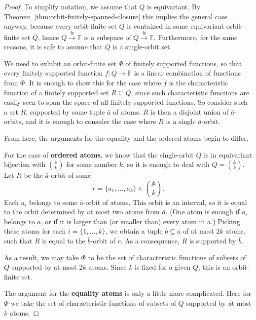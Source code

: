 \documentclass[10pt,a4paper]{amsart}
\numberwithin{equation}{section}
\newcommand{\atoms}{\mathbb A}
\newcommand{\field}{\mathbb F}
\newcommand{\finsup}{\stackrel{\mathrm{fs}}{\to}}
\newcommand{\forms}[1]{#1 \finsup \field}
\begin{document}
\begin{proof}
To simplify notation, we assume that $Q$ is equivariant. By Theorem~\ref{thm:orbit-finitely-spanned-closure} this implies the general case anyway, because every orbit-finite set $Q$ is contained in some equivariant orbit-finite set $\bar{Q}$, hence $\forms Q$ is a subspace of $\forms {\bar{Q}}$. Furthermore, for the same reasons, it is safe to assume that $Q$ is a single-orbit set.

We need to exhibit an orbit-finite set $\Phi$ of finitely supported functions, so that every finitely supported function $f:Q\to\field$ is a linear combination of functions from $\Phi$. It is enough to show this for the case where $f$ is the characteristic function of a finitely supported set $R\subseteq Q$, since such characteristic functions are easily seen to span the space of all finitely supported functions. So consider such a set $R$, supported by some tuple $\bar a$ of atoms. $R$ is then a disjoint union of $\bar a$-orbits, and it is enough to consider the case where $R$ is a single $\bar a$-orbit.

From here, the arguments for the equality and the ordered atoms begin to differ.

For the case of {\bf ordered atoms}, we know that the single-orbit $Q$ is in equivariant bijection with $\atoms\choose k$ for some number $k$, so it is enough to deal with $Q={\atoms\choose k}$. Let $R$ be the $\bar a$-orbit of some 
\[
	\textstyle r = \{a_1,\ldots,a_k\}\in{\atoms\choose k}.
\]
Each $a_i$ belongs to some $\bar a$-orbit of atoms. This orbit is an interval, so it is equal to the orbit determined by at most two atoms from $\bar a$. (One atom is enough if $a_i$ belongs to $\bar a$, or if it is larger than (or smaller than) every atom in $\bar a$.) Picking these atoms for each $i=\{1,\ldots, k\}$, we obtain a tuple $\bar b\subseteq \bar a$ of at most $2k$ atoms, such that $R$ is equal to the $\bar b$-orbit of $r$. As a consequence, $R$ is supported by $\bar b$.

As a result, we may take $\Phi$ to be the set of characteristic functions of subsets of $Q$ supported by at most $2k$ atoms. Since $k$ is fixed for a given $Q$, this is an orbit-finite set.

The argument for the {\bf equality atoms} is only a little more complicated. Here for $\Phi$ we take the set of characteristic functions of subsets of $Q$ supported by at most $k$ atoms. 


\end{proof}
\end{document}
